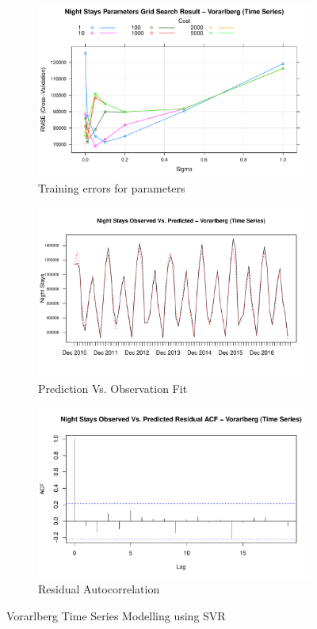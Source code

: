 \documentclass[a4paper,reqno,]{article}
\begin{document}
\begin{figure}[H]
  \centering
  \begin{subfigure}[b]{0.32\linewidth}
    \includegraphics[width=\linewidth]{images/SVR/VorarlbergGrid.pdf}
    \caption{Training errors for parameters}
  \end{subfigure}
  \begin{subfigure}[b]{0.32\linewidth}
    \includegraphics[width=\linewidth]{images/SVR/VorarlbergTimeSeries.pdf}
    \caption{Prediction Vs. Observation Fit}
  \end{subfigure}
  \begin{subfigure}[b]{0.32\linewidth}
    \includegraphics[width=\linewidth]{images/SVR/VorarlbergACF.pdf}
    \caption{Residual Autocorrelation}
  \end{subfigure}
  \caption{Vorarlberg Time Series Modelling using SVR}
  \label{fig:Time Series}
\end{figure}
\end{document}
